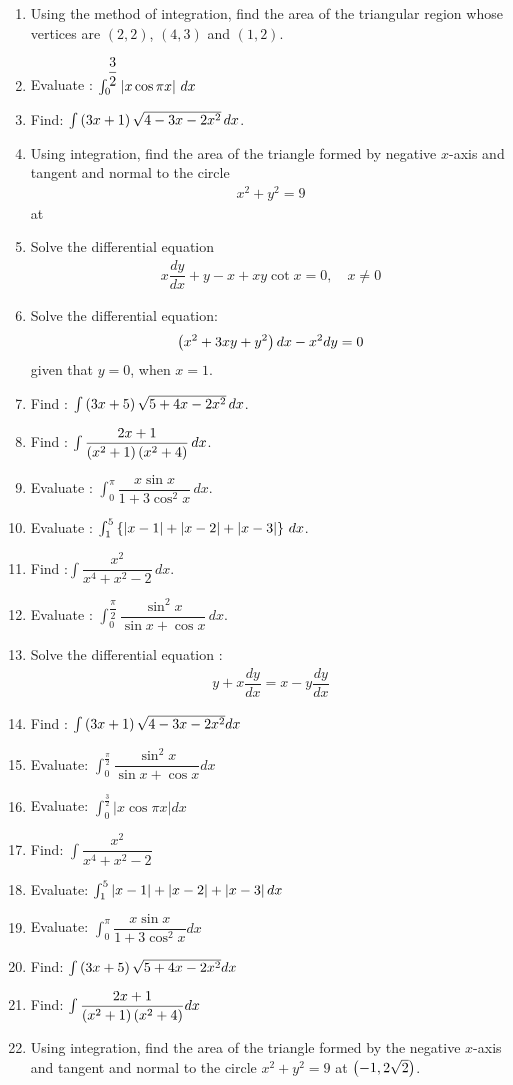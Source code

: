 \begin{enumerate}
	\item Using the method of integration, find the area of the triangular region whose vertices are $(2, 2)$, $(4, 3)$ and $(1, 2)$.
\item Evaluate : $\int_{0}^{\dfrac{3}{2}} \left\vert x \cos \pi x\right\vert\,dx$
    \item Find: $\int \left(3x +1\right)\sqrt{4-3x-2x^2} \,dx$.
    \item Using integration, find the area of the triangle formed by negative $x$-axis and tangent and normal to the circle
          \begin{align*}
              x^2 + y^2 =9
          \end{align*}
          at 
    \item Solve the differential equation
          \begin{align*}
              x\dfrac{dy}{dx} +y -x +xy \cot x= 0, \quad x\neq 0
          \end{align*}
    \item Solve the differential equation:
          \begin{align*}
              \left(x^2+3xy+y^2\right)dx -x^2dy = 0
          \end{align*}
          given that $y=0$, when $x=1$.
    \item Find : $\int \left(3x+5\right)\sqrt{5+4x-2x^2}\,dx$.
    \item Find : $\int \dfrac{2x+1}{\left(x^2+1\right)\left(x^2+4\right)}\,dx$.
    \item Evaluate : $\int_{0}^{\pi}\dfrac{x\sin x}{1+3\cos^2 x}\,dx$.
    \item Evaluate : $\int_{1}^{5}\left\{\left\vert x-1\right\vert+\left\vert x-2\right\vert+\left\vert x-3\right\vert\right\}\,dx$.
    \item Find :$\int \dfrac{x^2}{x^4 + x^2 -2}\,dx$.
    \item Evaluate : $\int_{0}^{\dfrac{\pi}{2}} \dfrac{\sin^2 x}{\sin x + \cos x} \,dx$.
    \item Solve the differential equation :
          \begin{align*}
              y+ x\dfrac{dy}{dx} = x-y\dfrac{dy}{dx}
          \end{align*}

\item Find : $\int{\ensuremath{\left(3x+1\right)}\sqrt{4 - 3x - 2x^2}dx}$
\item Evaluate: $ \int^{\frac{\pi}{2}}_0{\dfrac{\sin^2{x}}{\sin{x} + \cos{x}}dx}$
\item Evaluate: $\int^{\frac{3}{2}}_0{|x\cos{\pi x}|dx}$
\item Find: $\int{\dfrac{x^2}{x^4 + x^2 -2}}$
\item Evaluate: $\int^5_1{\left\vert x-1\right\vert + \left\vert x-2\right\vert + \left\vert x-3\right\vert dx}$
\item Evaluate: $ \int^{\pi}_0{\dfrac{x\sin{x}}{1 + 3\cos^2{x}}dx}$
\item Find: $\int{\ensuremath{\left(3x+5\right)}\sqrt{5 + 4x - 2x^2}dx}$
\item Find: $\int{\dfrac{2x+1}{\ensuremath{\left(x^2 + 1\right)}\ensuremath{\left(x^2 + 4\right)}}dx}$
\item Using integration, find the area of the triangle formed by the negative $x$-axis and tangent and normal to the circle $x^2 + y^2 = 9$ at $\left(-1,2\sqrt{2}\right)$.
\end{enumerate}
